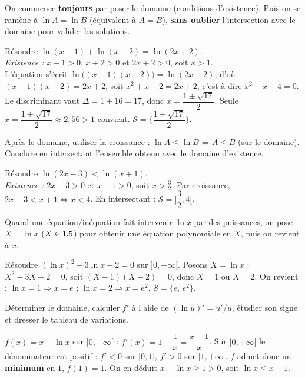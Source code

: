 On commence \textbf{toujours} par poser le domaine (conditions d'existence). Puis on se
ramène à $\ln A=\ln B$ (équivalent à $A=B$), \textbf{sans oublier} l'intersection avec le
domaine pour valider les solutions.
\begin{exemple}
Résoudre $\ln(x-1)+\ln(x+2)=\ln(2x+2)$.\\
\emph{Existence :} $x-1>0$, $x+2>0$ et $2x+2>0$, soit $x>1$.\\
L'équation s'écrit $\ln\big((x-1)(x+2)\big)=\ln(2x+2)$, d'où $(x-1)(x+2)=2x+2$, soit
$x^{2}+x-2=2x+2$, c'est-à-dire $x^{2}-x-4=0$. Le discriminant vaut $\Delta=1+16=17$, donc
$x=\dfrac{1\pm\sqrt{17}}2$. Seule $x=\dfrac{1+\sqrt{17}}2\approx2{,}56>1$ convient.
\textbf{$\mathcal S=\Big\{\dfrac{1+\sqrt{17}}2\Big\}$.}
\end{exemple}

Après le domaine, utiliser la croissance : $\ln A\le\ln B\iff A\le B$ (sur le domaine).
Conclure en intersectant l'ensemble obtenu avec le domaine d'existence.
\begin{exemple}
Résoudre $\ln(2x-3)<\ln(x+1)$.\\
\emph{Existence :} $2x-3>0$ et $x+1>0$, soit $x>\tfrac32$. Par croissance,
$2x-3<x+1\iff x<4$. En intersectant : $\mathcal S=\Big]\dfrac32,4\Big[$.
\end{exemple}

Quand une équation/inéquation fait intervenir $\ln x$ par des puissances, on pose
$X=\ln x$ ($X\in1.5$) pour obtenir une équation polynomiale en $X$, puis on revient à $x$.
\begin{exemple}
Résoudre $(\ln x)^{2}-3\ln x+2=0$ sur $]0,+\infty[$. Posons $X=\ln x$ :
$X^{2}-3X+2=0$, soit $(X-1)(X-2)=0$, donc $X=1$ ou $X=2$. On revient : $\ln x=1\Rightarrow
x=e$ ; $\ln x=2\Rightarrow x=e^{2}$. \textbf{$\mathcal S=\{e,\,e^{2}\}$.}
\end{exemple}

Déterminer le domaine, calculer $f'$ à l'aide de $(\ln u)'=u'/u$, étudier son signe et
dresser le tableau de variations.
\begin{exemple}
$f(x)=x-\ln x$ sur $]0,+\infty[$ : $f'(x)=1-\dfrac1x=\dfrac{x-1}{x}$. Sur $]0,+\infty[$ le
dénominateur est positif : $f'<0$ sur $]0,1[$, $f'>0$ sur $]1,+\infty[$. $f$ admet donc un
\textbf{minimum} en $1$, $f(1)=1$. On en déduit $x-\ln x\ge1>0$, soit $\ln x\le x-1$.
\end{exemple}

